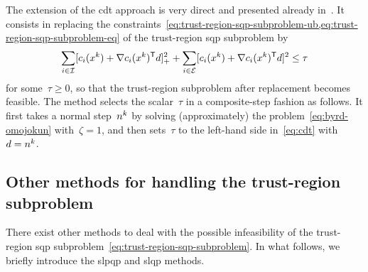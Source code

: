 The extension of the \gls{cdt} approach is very direct and presented already in~\cite[\S~15.4.4]{Conn_Gould_Toint_2000}.
It consists in replacing the constraints~\cref{eq:trust-region-sqp-subproblem-ub,eq:trust-region-sqp-subproblem-eq} of the trust-region \gls{sqp} subproblem by
\begin{equation}
    \label{eq:cdt}
    \sum_{i \in \iub} \posp{\con{i}(\iter[k]) + \nabla \con{i}(\iter[k])^{\T} \step}^2 + \sum_{i \in \ieq} [\con{i}(\iter[k]) + \nabla \con{i}(\iter[k])^{\T} \step]^2 \le \tau
\end{equation}
for some~$\tau \ge 0$, so that the trust-region subproblem after replacement becomes feasible.
The method selects the scalar~$\tau$ in a composite-step fashion as follows.
It first takes a normal step~$\nstep[k]$ by solving (approximately) the problem~\cref{eq:byrd-omojokun} with~$\zeta = 1$, and then sets~$\tau$ to the left-hand side in~\cref{eq:cdt} with~$\step = \nstep[k]$.

\subsection{Other methods for handling the trust-region  subproblem}

There exist other methods to deal with the possible infeasibility of the trust-region \gls{sqp} subproblem~\cref{eq:trust-region-sqp-subproblem}.
In what follows, we briefly introduce the  \gls{slpqp} and \gls{slqp} methods.

